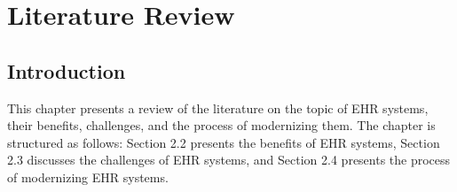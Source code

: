 \chapter{Literature Review}
\label{chap:lit_review}

\section{Introduction}

This chapter presents a review of the literature on the topic of EHR systems, their benefits, challenges, and the process of modernizing them. The chapter is structured as follows: Section 2.2 presents the benefits of EHR systems, Section 2.3 discusses the challenges of EHR systems, and Section 2.4 presents the process of modernizing EHR systems.